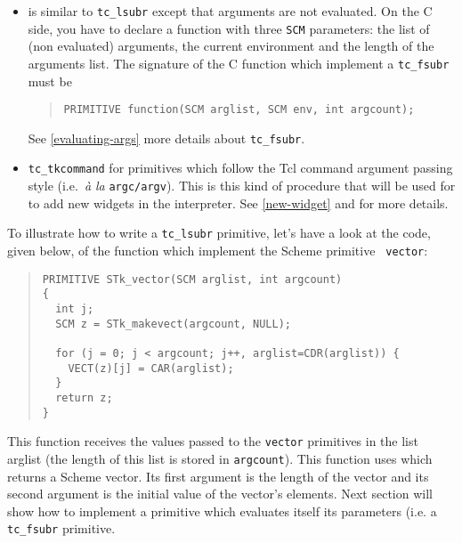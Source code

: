 \documentclass[10pt]{article}
\begin{document}
\begin{itemize}
      primitive. Hence, the signature of the C function which implement a {\tt
      tc\_lsubr} must be
\begin{quote}
\begin{verbatim}
PRIMITIVE function(SCM arglist, int argcount);
\end{verbatim}
\end{quote}
      Note that all the Scheme arguments are evaluated during the
      construction of the list which is passed to the C function.
\item {} is similar to {\tt tc\_lsubr} except that
      arguments are not evaluated. On the C side, you have to declare a function
      with three {\tt SCM} parameters: the list of (non evaluated) arguments,
      the current environment and the length of the arguments list. The
      signature of the C function which implement a {\tt tc\_fsubr} must be
\begin{quote}
\begin{verbatim}
PRIMITIVE function(SCM arglist, SCM env, int argcount);
\end{verbatim}
\end{quote}
      See \ref{evaluating-args} more details about {\tt tc\_fsubr}.

\item {\tt tc\_tkcommand} for primitives which follow  the Tcl
      command argument passing style (i.e.~{\em \`a la} {\tt argc/argv}). This
      is this kind of procedure that will be used for to add new widgets in the
      {\stk} interpreter. See \ref{new-widget} and \cite{ouster-book} for more
      details.
\end{itemize}

To illustrate how to write a {\tt tc\_lsubr} primitive, let's have a look at the
code, given below, of the function which implement the Scheme primitive {\tt
vector}:
\begin{quote}{\small
\begin{verbatim}
PRIMITIVE STk_vector(SCM arglist, int argcount)
{
  int j;
  SCM z = STk_makevect(argcount, NULL);
  
  for (j = 0; j < argcount; j++, arglist=CDR(arglist)) {
    VECT(z)[j] = CAR(arglist);
  }
  return z;
}
\end{verbatim}
}\end{quote}

This function receives the values passed to the {\tt vector} primitives in the
list arglist (the length of this list is stored in {\tt argcount}). This
function uses  which returns a Scheme vector. Its first
argument is the length of the vector and its second argument is the initial
value of the vector's elements.  Next section will show how to implement a
primitive which evaluates itself its parameters (i.e. a {\tt tc\_fsubr}
primitive.
\end{document}
